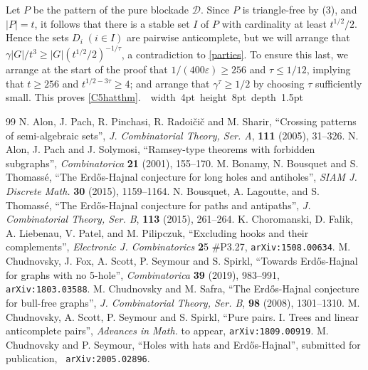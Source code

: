 \documentclass[titlepage,11pt]{article}
\newcommand\blackslug{\hbox{\hskip 1pt \vrule width 4pt height 8pt depth 1.5pt
        \hskip 1pt}}
\newcommand\bbox{\hfill \quad \blackslug \bigbreak}
\newcommand{\vare}{\varepsilon}
\begin{document}
\bigskip

Let $P$ be the pattern of the pure blockade $\mathcal{D}$. Since $P$ is triangle-free by (3),  and $|P|=t$, it follows that there is
a stable set $I$  of $P$ with cardinality at least $t^{1/2}/2$. Hence the sets $D_i\;(i\in I)$ are pairwise anticomplete, but
we will arrange that $\gamma|G|/t^3\ge |G|(t^{1/2}/2)^{-1/\tau}$, a contradiction to \ref{parties}. To ensure this last, we arrange at the start of the proof that
$1/(400\vare)\ge 256$ and $\tau\le 1/12$, implying that $t\ge 256$ and $t^{1/2-3\tau}\ge 4$; and arrange that $\gamma^\tau\ge 1/2$ by choosing 
$\tau$ sufficiently small. This proves \ref{C5hatthm}.~\bbox



\begin{thebibliography}{99}
N. Alon, J. Pach, R. Pinchasi, R. Radoi\v ci\v c and M. Sharir, ``Crossing patterns of semi-algebraic
sets'', {\em J. Combinatorial Theory, Ser. A}, {\bf 111} (2005), 31--326.
 N. Alon, J. Pach and J. Solymosi, ``Ramsey-type theorems with forbidden subgraphs'', {\em Combinatorica} {\bf 21} (2001), 155--170.
 M. Bonamy, N. Bousquet and S. Thomass\'e, ``The Erd\H{o}s-Hajnal conjecture for long holes and antiholes'',
{\em SIAM J. Discrete Math.} {\bf 30} (2015), 1159--1164.
 N. Bousquet, A. Lagoutte, and S. Thomass\'e, ``The Erd\H{o}s-Hajnal conjecture for paths and
antipaths'', {\em J. Combinatorial Theory, Ser. B}, {\bf 113} (2015), 261--264.
 K. Choromanski, D. Falik, A. Liebenau, V. Patel, and M. Pilipczuk, ``Excluding hooks and their
complements'', {\em Electronic J. Combinatorics} {\bf 2}5 \#P3.27, {\tt arXiv:1508.00634}.
 M. Chudnovsky, J. Fox, A. Scott, P. Seymour and S. Spirkl,
``Towards Erd\H{o}s-Hajnal for graphs with no 5-hole'', {\em Combinatorica} {\bf 39} (2019), 983--991, {\tt arXiv:1803.03588}.
 M. Chudnovsky and M. Safra, ``The Erd\H{o}s-Hajnal conjecture for bull-free graphs'', {\em J. Combinatorial Theory, Ser. B}, {\bf 98} (2008), 1301--1310.
 M. Chudnovsky, A. Scott, P. Seymour and S. Spirkl,
``Pure pairs. I. Trees and linear anticomplete pairs'',
{\em Advances in Math.} to appear, {\tt arXiv:1809.00919}. 
 M. Chudnovsky and P. Seymour, ``Holes with hats and Erd\H{o}s-Hajnal'', submitted for publication, {\tt
arXiv:2005.02896}.

\end{thebibliography}
\end{document}
